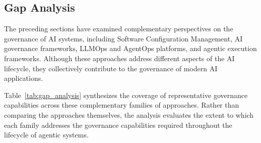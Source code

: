 \documentclass[10pt]{article}
\begin{document}
\subsection{Gap Analysis}
\label{sec:gap_analysis}

The preceding sections have examined complementary perspectives on the governance of AI systems, including Software Configuration Management, AI governance frameworks, LLMOps and AgentOps platforms, and agentic execution frameworks. Although these approaches address different aspects of the AI lifecycle, they collectively contribute to the governance of modern AI applications.

Table~\ref{tab:gap_analysis} synthesizes the coverage of representative governance capabilities across these complementary families of approaches. Rather than comparing the approaches themselves, the analysis evaluates the extent to which each family addresses the governance capabilities required throughout the lifecycle of agentic systems.
\end{document}
